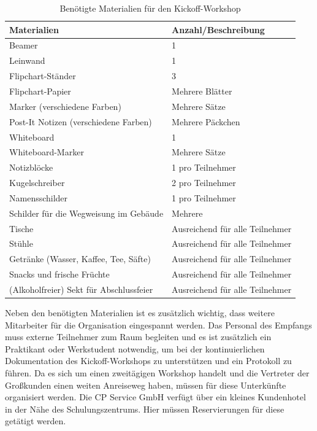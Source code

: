 \begin{table}[h]
	\centering
	\begin{tabular}{|l|l|}
		\hline
		\textbf{Materialien}             & \textbf{Anzahl/Beschreibung} \\
		\hline
		Beamer & 1 \\
		\hline
		Leinwand & 1 \\
		\hline
		Flipchart-Ständer & 3 \\
		\hline
		Flipchart-Papier & Mehrere Blätter \\
		\hline
		Marker (verschiedene Farben) & Mehrere Sätze \\
		\hline
		Post-It Notizen (verschiedene Farben) & Mehrere Päckchen \\
		\hline
		Whiteboard & 1 \\
		\hline
		Whiteboard-Marker & Mehrere Sätze \\
		\hline
		Notizblöcke & 1 pro Teilnehmer \\
		\hline
		Kugelschreiber & 2 pro Teilnehmer \\
		\hline
		Namensschilder & 1 pro Teilnehmer \\
		\hline
		Schilder für die Wegweisung im Gebäude & Mehrere \\
		\hline
		Tische & Ausreichend für alle Teilnehmer \\
		\hline
		Stühle & Ausreichend für alle Teilnehmer \\
		\hline
		Getränke (Wasser, Kaffee, Tee, Säfte) & Ausreichend für alle Teilnehmer \\
		\hline
		Snacks und frische Früchte & Ausreichend für alle Teilnehmer \\
		\hline
		(Alkoholfreier) Sekt für Abschlussfeier & Ausreichend für alle Teilnehmer \\
		\hline
	\end{tabular}
	\caption{Benötigte Materialien für den Kickoff-Workshop}
	\label{tab:materialien}
\end{table}

Neben den benötigten Materialien ist es zusätzlich wichtig, dass weitere Mitarbeiter für die Organisation eingespannt werden. Das Personal des Empfangs muss externe Teilnehmer zum Raum begleiten und es ist zusätzlich ein Praktikant oder Werkstudent notwendig, um bei der kontinuierlichen Dokumentation des Kickoff-Workshops zu unterstützen und ein Protokoll zu führen. Da es sich um einen zweitägigen Workshop handelt und die Vertreter der Großkunden einen weiten Anreiseweg haben, müssen für diese Unterkünfte organisiert werden. Die CP Service GmbH verfügt über ein kleines Kundenhotel in der Nähe des Schulungszentrums. Hier müssen Reservierungen für diese getätigt werden. 


